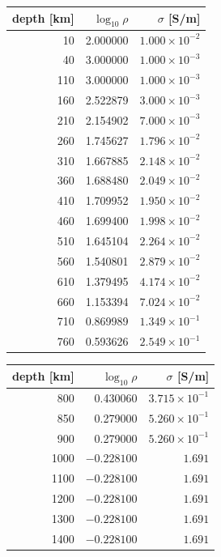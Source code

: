 \documentclass[11pt]{article}
\begin{document}
\begin{table}[h]
\centering
\begin{minipage}{0.48\textwidth}
\centering
\begin{tabular}{rrr}
\toprule
depth [km] & $\log_{10}\rho$ & $\sigma$ [S/m] \\
\midrule
10   & 2.000000  & $1.000\times10^{-2}$ \\
40   & 3.000000  & $1.000\times10^{-3}$ \\
110  & 3.000000  & $1.000\times10^{-3}$ \\
160  & 2.522879  & $3.000\times10^{-3}$ \\
210  & 2.154902  & $7.000\times10^{-3}$ \\
260  & 1.745627  & $1.796\times10^{-2}$ \\
310  & 1.667885  & $2.148\times10^{-2}$ \\
360  & 1.688480  & $2.049\times10^{-2}$ \\
410  & 1.709952  & $1.950\times10^{-2}$ \\
460  & 1.699400  & $1.998\times10^{-2}$ \\
510  & 1.645104  & $2.264\times10^{-2}$ \\
560  & 1.540801  & $2.879\times10^{-2}$ \\
610  & 1.379495  & $4.174\times10^{-2}$ \\
660  & 1.153394  & $7.024\times10^{-2}$ \\
710  & 0.869989  & $1.349\times10^{-1}$ \\
760  & 0.593626  & $2.549\times10^{-1}$ \\
\bottomrule
\end{tabular}
\end{minipage}
\hfill
\begin{minipage}{0.48\textwidth}
\centering
\begin{tabular}{rrr}
\toprule
depth [km] & $\log_{10}\rho$ & $\sigma$ [S/m] \\
\midrule
800  & 0.430060  & $3.715\times10^{-1}$ \\
850  & 0.279000  & $5.260\times10^{-1}$ \\
900  & 0.279000  & $5.260\times10^{-1}$ \\
1000 & $-0.228100$ & $1.691$ \\
1100 & $-0.228100$ & $1.691$ \\
1200 & $-0.228100$ & $1.691$ \\
1300 & $-0.228100$ & $1.691$ \\
1400 & $-0.228100$ & $1.691$ \\

\end{tabular}
\end{minipage}
\end{table}
\end{document}
